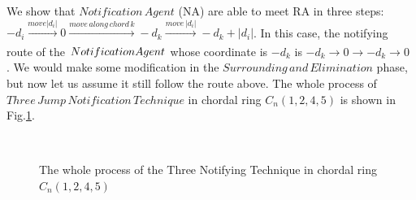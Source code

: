 \documentclass[conference]{IEEEtran}
\begin{document}
We show that $Notification\,Agent$ (NA) are able to meet RA in three steps: $-d_i\xrightarrow[]{move\left | d_i \right |}0\xrightarrow[]{move\,along\,chord\,k}-d_k\xrightarrow[]{move\,\left | d_i \right |}-d_k+\left|d_i\right|$. In this case, the notifying route of the $Notification\,\\Agent$ whose coordinate is $-d_k$ is $-d_k{\rightarrow}0{\rightarrow}-d_k{\rightarrow}0$ . We would make some modification in the $Surrounding\,and\,Elimination$ phase, but now let us assume it still follow the route above. The whole process of $Three\,Jump\,Notification\, Technique$ in chordal ring $C_n(1, 2, 4, 5)$ is shown in Fig.\ref{fig:subfig}. 

\begin{figure}
  \centering 
  \hspace{1in} 
   \
  \hspace{1in} 
  \hspace{1in} 
  \caption{The whole process of the Three Notifying Technique in chordal ring $C_n(1, 2, 4, 5)$} 
  \label{fig:subfig} %
\end{figure}
\end{document}

